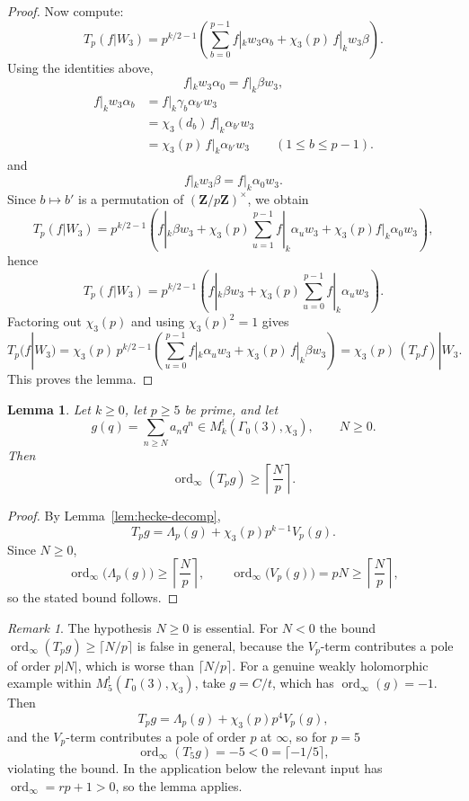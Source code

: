\documentclass[11pt]{amsart}
\newtheorem{lemma}[theorem]{Lemma}
\theoremstyle{remark}
\newtheorem{remark}[theorem]{Remark}
\DeclareMathOperator{\ord}{ord}
\newcommand{\Z}{\mathbf{Z}}
\begin{document}
\begin{proof}
Now compute:
\[
T_p(f|W_3)
=
p^{k/2-1}\left(
\sum_{b=0}^{p-1}f|_k w_3\alpha_b
+\chi_3(p)\,f|_k w_3\beta
\right).
\]
Using the identities above,
\[
f|_k w_3\alpha_0=f|_k\beta w_3,
\]
\begin{align*}
f|_k w_3\alpha_b
&=
f|_k\gamma_b\alpha_{b'}w_3 \\
&=
\chi_3(d_b)\,f|_k\alpha_{b'}w_3 \\
&=
\chi_3(p)\,f|_k\alpha_{b'}w_3
\qquad (1\le b\le p-1).
\end{align*}
and
\[
f|_k w_3\beta=f|_k\alpha_0 w_3.
\]
Since $b\mapsto b'$ is a permutation of $(\Z/p\Z)^\times$, we obtain
\[
T_p(f|W_3)
=
p^{k/2-1}\left(
f|_k\beta w_3
+\chi_3(p)\sum_{u=1}^{p-1}f|_k\alpha_u w_3
+\chi_3(p)f|_k\alpha_0 w_3
\right),
\]
hence
\[
T_p(f|W_3)
=
p^{k/2-1}\left(
f|_k\beta w_3
+\chi_3(p)\sum_{u=0}^{p-1}f|_k\alpha_u w_3
\right).
\]
Factoring out $\chi_3(p)$ and using $\chi_3(p)^2=1$ gives
\[
T_p(f|W_3)
=
\chi_3(p)\,
p^{k/2-1}\left(
\sum_{u=0}^{p-1}f|_k\alpha_u w_3
+\chi_3(p)\,f|_k\beta w_3
\right)
=
\chi_3(p)\,(T_pf)|W_3.
\]
This proves the lemma.
\end{proof}

\begin{lemma}\label{lem:ordinf-Tp}
Let $k\ge0$, let $p\ge5$ be prime, and let
\[
g(q)=\sum_{n\ge N}a_n q^n\in M_k^!(\Gamma_0(3),\chi_3),
\qquad N\ge 0.
\]
Then
\[
\ord_\infty(T_pg)\ge \left\lceil\frac{N}{p}\right\rceil.
\]
\end{lemma}

\begin{proof}
By Lemma~\ref{lem:hecke-decomp},
\[
T_pg=\Lambda_p(g)+\chi_3(p)p^{k-1}V_p(g).
\]
Since $N\ge 0$,
\[
\ord_\infty\bigl(\Lambda_p(g)\bigr)\ge \left\lceil\frac{N}{p}\right\rceil,
\qquad
\ord_\infty\bigl(V_p(g)\bigr)=pN\ge \left\lceil\frac{N}{p}\right\rceil,
\]
so the stated bound follows.
\end{proof}

\begin{remark}
The hypothesis $N\ge0$ is essential. For $N<0$ the bound $\ord_\infty(T_pg)\ge \lceil N/p\rceil$
is false in general, because the $V_p$-term contributes a pole of order $p|N|$, which is worse
than $\lceil N/p\rceil$. For a genuine weakly holomorphic example within $M_5^!(\Gamma_0(3),\chi_3)$,
take $g=C/t$, which has $\ord_\infty(g)=-1$. Then
\[
T_pg=\Lambda_p(g)+\chi_3(p)p^4 V_p(g),
\]
and the $V_p$-term contributes a pole of order $p$ at $\infty$, so for $p=5$
\[
\ord_\infty(T_5g)=-5<0=\lceil -1/5\rceil,
\]
violating the bound. In the application below the relevant input has $\ord_\infty=rp+1>0$, so
the lemma applies.
\end{remark}
\end{document}
